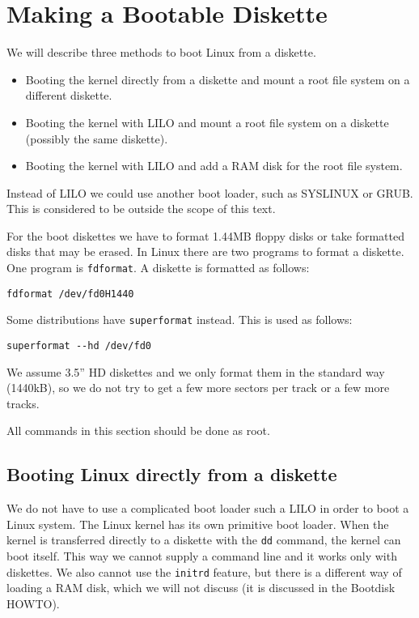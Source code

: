 \documentclass[12pt,a4paper]{article}
\begin{document}
\section{Making a Bootable Diskette}

We will describe three methods to boot Linux from a diskette.
\begin{itemize}
\item Booting the kernel directly from a diskette and mount a root
  file system on a different diskette.
\item Booting the kernel with LILO and mount a root file system on a
  diskette (possibly the same diskette).
\item Booting the kernel with LILO and add a RAM disk for the root
  file system.
\end{itemize}
Instead of LILO we could use another boot loader, such as SYSLINUX or
GRUB. This is considered to be outside the scope of this text.

For the boot diskettes we have to
format 1.44MB floppy disks or take formatted disks that may be
erased. In Linux there are two programs to format a diskette. One program is
{\tt fdformat}. A diskette is formatted as follows:
\begin{verbatim}
fdformat /dev/fd0H1440
\end{verbatim}
Some distributions have {\tt superformat} instead. This is used as follows:
\begin{verbatim}
superformat --hd /dev/fd0
\end{verbatim}
We assume 3.5'' HD diskettes and we only format them in the standard
way (1440kB), so we do not try to get a few more sectors per track or
a few more tracks.

All commands in this section should be done as root.

\subsection{Booting Linux directly from a diskette}

We do not have to use a complicated boot loader such a LILO in order
to boot a Linux system. The Linux kernel has its own primitive boot
loader. When the kernel is transferred directly to a diskette with the
{\tt dd} command, the kernel can boot itself. This way we cannot
supply a command line and it works only with diskettes. We also cannot
use the {\tt initrd} feature, but there is a different way of loading
a RAM disk, which we will not discuss (it is discussed in the Bootdisk
HOWTO).
\end{document}
